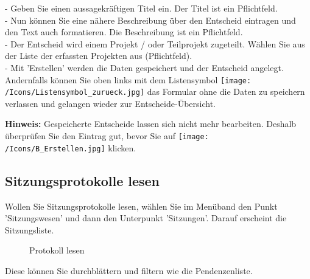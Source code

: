 - Geben Sie einen aussagekräftigen Titel ein. Der Titel ist ein Pflichtfeld.\\
- Nun können Sie eine nähere Beschreibung über den Entscheid eintragen und den Text auch formatieren. Die Beschreibung ist ein Pflichtfeld.\\
- Der Entscheid wird einem Projekt / oder Teilprojekt zugeteilt. Wählen Sie aus der Liste der erfassten Projekten aus (Pflichtfeld).\\
- Mit 'Erstellen' werden die Daten gespeichert und der Entscheid angelegt. Andernfalls können Sie oben links mit dem Listensymbol \texttt{[image: /Icons/Listensymbol\_zurueck.jpg]} das Formular ohne die Daten zu speichern verlassen und gelangen wieder zur Entscheide-Übersicht.\\

\vspace{2cm}

\textbf{Hinweis:} Gespeicherte Entscheide lassen sich nicht mehr bearbeiten. Deshalb überprüfen Sie den Eintrag gut, bevor Sie auf \texttt{[image: /Icons/B\_Erstellen.jpg]} klicken.

\clearpage

\subsection{Sitzungsprotokolle lesen}

Wollen Sie Sitzungsprotokolle lesen, wählen Sie im Menüband den Punkt 'Sitzungswesen' und dann den Unterpunkt 'Sitzungen'. Darauf erscheint die Sitzungsliste.

\begin{figure}[H]
\caption{Protokoll lesen}
\end{figure}

Diese können Sie durchblättern und filtern wie die Pendenzenliste.

